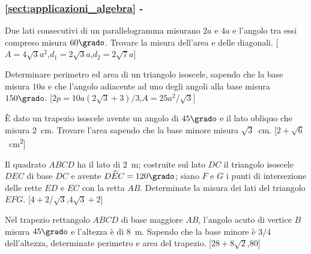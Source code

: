 \begingroup
\hypersetup{linkcolor=black}
\subsubsection*{\ref{sect:applicazioni_algebra} - 
}
\endgroup

\begin{multicols}{2}


\begin{esercizio}
\label{ese:7.16}
Due lati consecutivi di un parallelogramma misurano \(2a\) e \(4a\) e 
l'angolo tra essi compreso misura \(60\grado\). Trovare la misura 
dell'area e delle diagonali.
\hfill[\(A=4\sqrt{3}a^2\),\quad \(d_1=2\sqrt{3}a\),\quad \(d_2=2\sqrt{7}a\)]
\end{esercizio}

\begin{esercizio}
\label{ese:7.18}
Determinare perimetro ed area di un triangolo isoscele, sapendo che 
la base misura \(10a\) e che l'angolo adiacente ad uno degli angoli 
alla base misura \(150\grado\).
\hfill[\(2p=10a(2\sqrt{3}+3)/3\),\quad \(A=25a^2/\sqrt{3}\)]
\end{esercizio}


\begin{esercizio}
\label{ese:7.21}
\`E dato un trapezio isoscele avente un angolo di \(45\grado\) e il 
lato obliquo che misura 2~cm. Trovare l'area sapendo che la base 
minore misura \(\sqrt{3}\)~cm.
\hfill[\(2+\sqrt{6}\)~cm\textsuperscript{2}]
\end{esercizio}

\begin{esercizio}
\label{ese:7.23}
Il quadrato \(ABCD\) ha il lato di 2~m; costruite sul lato \(DC\) il 
triangolo isoscele \(DEC\) di base \(DC\) e avente 
\(D\widehat{E}C=120\grado\); siano \(F\) e \(G\) i punti di intersezione 
delle rette \(ED\) e \(EC\) con la retta \(AB\). Determinate la misura dei 
lati del triangolo \(EFG\).
\hfill[\(4+2/\sqrt{3}\),\quad \(4\sqrt{3}+2\)]
\end{esercizio}


\begin{esercizio}
\label{ese:7.26}
Nel trapezio rettangolo \(ABCD\) di base maggiore \(AB\), l'angolo acuto 
di vertice \(B\) misura \(45\grado\) e l'altezza è di 8~m. Sapendo che la 
base minore è \(3/4\) dell'altezza, determinate perimetro e area del 
trapezio.
\hfill[\(28+8\sqrt{2}\),\quad \(80\)]
\end{esercizio}


\end{multicols}
